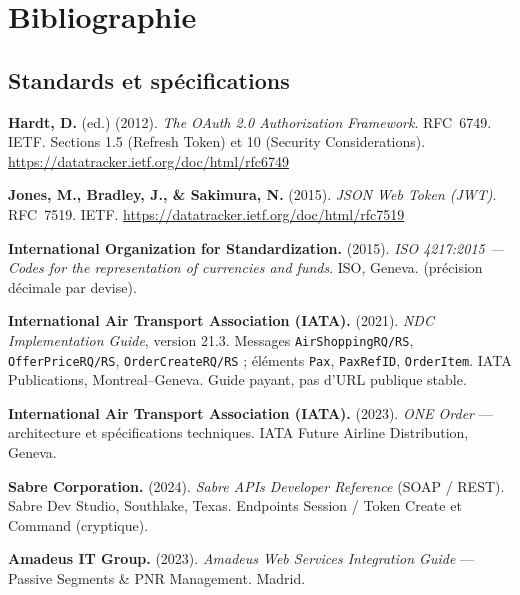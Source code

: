 \chapter*{Bibliographie}

\section*{Standards et spécifications}
\begin{enumerate}[label={[\arabic*]},leftmargin=*,itemsep=5pt]
    \item \textbf{Hardt, D.} (ed.) (2012). \textit{The OAuth 2.0 Authorization Framework}. RFC~6749. IETF. Sections 1.5 (Refresh Token) et 10 (Security Considerations). \url{https://datatracker.ietf.org/doc/html/rfc6749}
    \item \textbf{Jones, M., Bradley, J., \& Sakimura, N.} (2015). \textit{JSON Web Token (JWT)}. RFC~7519. IETF. \url{https://datatracker.ietf.org/doc/html/rfc7519}
    \item \textbf{International Organization for Standardization.} (2015). \textit{ISO 4217:2015 --- Codes for the representation of currencies and funds}. ISO, Geneva. (précision décimale par devise).
    \item \textbf{International Air Transport Association (IATA).} (2021). \textit{NDC Implementation Guide}, version 21.3. Messages \texttt{AirShoppingRQ/RS}, \texttt{OfferPriceRQ/RS}, \texttt{OrderCreateRQ/RS} ; éléments \texttt{Pax}, \texttt{PaxRefID}, \texttt{OrderItem}. IATA Publications, Montreal--Geneva. Guide payant, pas d'URL publique stable.
    \item \textbf{International Air Transport Association (IATA).} (2023). \textit{ONE Order} --- architecture et spécifications techniques. IATA Future Airline Distribution, Geneva.
    \item \textbf{Sabre Corporation.} (2024). \textit{Sabre APIs Developer Reference} (SOAP / REST). Sabre Dev Studio, Southlake, Texas. Endpoints Session / Token Create et Command (cryptique).
    \item \textbf{Amadeus IT Group.} (2023). \textit{Amadeus Web Services Integration Guide} --- Passive Segments \& PNR Management. Madrid.
\end{enumerate}

